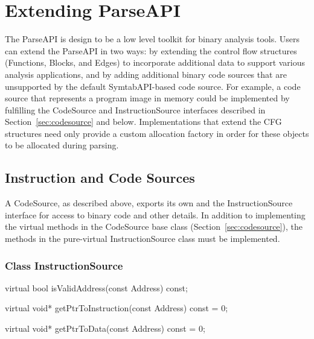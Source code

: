 \section{Extending ParseAPI}
\label{sec:extend}

The ParseAPI is design to be a low level toolkit for binary analysis tools.
Users can extend the ParseAPI in two ways: by extending the control flow
structures (Functions, Blocks, and Edges) to incorporate additional data to
support various analysis applications, and by adding additional binary code
sources that are unsupported by the default SymtabAPI-based code source. For
example, a code source that represents a program image in memory could be
implemented by fulfilling the CodeSource and InstructionSource interfaces
described in Section~\ref{sec:codesource} and below. Implementations that
extend the CFG structures need only provide a custom allocation factory in
order for these objects to be allocated during parsing.

\subsection{Instruction and Code Sources}

A CodeSource, as described above, exports its own and the InstructionSource interface for access to binary code and other details. In addition to implementing the virtual methods in the CodeSource base class (Section~\ref{sec:codesource}), the methods in the pure-virtual InstructionSource class must be implemented.

\subsubsection{Class InstructionSource}


\begin{apient}
virtual bool isValidAddress(const Address) const;
\end{apient}

\begin{apient}
virtual void* getPtrToInstruction(const Address) const = 0;
\end{apient}

\begin{apient}
virtual void* getPtrToData(const Address) const = 0;
\end{apient}

